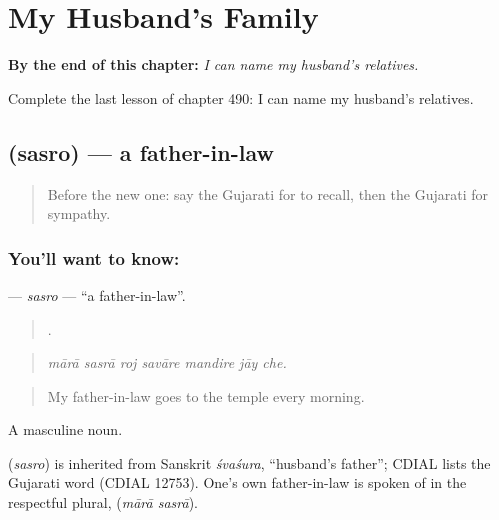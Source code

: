 
\chapter{My Husband's Family}
\label{ch:gu-my-husband-s-family}

\begin{chapteropening}
\textbf{By the end of this chapter:} \emph{I can name my husband's relatives.}

Complete the last lesson of chapter 490: I can name my husband's relatives.
\end{chapteropening}

\section[\texorpdfstring{\gu{સસરો} (sasro)}{સસરો (sasro)}]{ (sasro) — a father-in-law}

\label{lesson:GU-C490-sasro}



\begin{quote}
Before the new one: say the Gujarati for to recall, then the Gujarati for sympathy.
\end{quote}

\subsection*{You'll want to know: }
\textbf{} — \emph{sasro} — \textquotedblleft{}a father-in-law\textquotedblright{}.

\begin{quote}
      .
\end{quote}

\begin{quote}
\emph{mārā sasrā roj savāre mandire jāy che.}
\end{quote}

\begin{quote}
My father-in-law goes to the temple every morning.
\end{quote}

A masculine noun.

\begin{cousinweb}
\textbf{} (\emph{sasro}) is inherited from Sanskrit \emph{śvaśura}, \textquotedblleft{}husband's father\textquotedblright{}; CDIAL lists the Gujarati word (CDIAL 12753). One's own father-in-law is spoken of in the respectful plural, \textbf{ } (\emph{mārā sasrā}).
\end{cousinweb}

